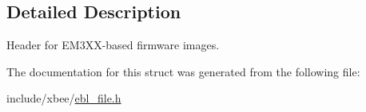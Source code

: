\subsection{Detailed Description}
Header for E\-M3\-X\-X-\/based firmware images. 

The documentation for this struct was generated from the following file\-:\begin{DoxyCompactItemize}
\item 
include/xbee/\hyperlink{ebl__file_8h}{ebl\-\_\-file.\-h}\end{DoxyCompactItemize}
